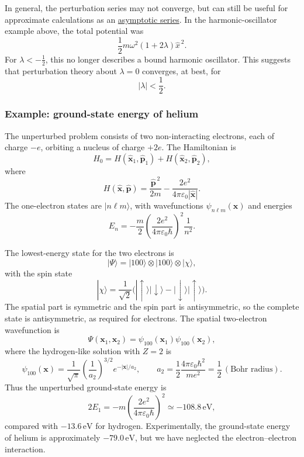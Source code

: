 \documentclass[11pt,a4paper]{article}
\begin{document}
In general, the perturbation series may not converge, but can still be
useful for approximate calculations as an \underline{asymptotic series}.
In the harmonic-oscillator example above, the total potential was
\[
    \frac12m\omega^2(1+2\lambda)\hat x^{\,2}.
\]
For $\lambda<-\tfrac12$, this no longer describes a bound harmonic
oscillator. This suggests that perturbation theory about $\lambda=0$
converges, at best, for
\[
    |\lambda|<\frac12.
\]

\subsubsection*{Example: ground-state energy of helium}

The unperturbed problem consists of two non-interacting electrons,
each of charge $-e$, orbiting a nucleus of charge $+2e$. The Hamiltonian is
\[
    H_0=H(\hat{\mathbf x}_1,\hat{\mathbf p}_1)
       +H(\hat{\mathbf x}_2,\hat{\mathbf p}_2),
\]
where
\[
    H(\hat{\mathbf x},\hat{\mathbf p})
      =\frac{\hat{\mathbf p}^{\,2}}{2m}
       -\frac{2e^2}{4\pi\varepsilon_0|\hat{\mathbf x}|}.
\]
The one-electron states are $|n\ell m\rangle$, with wavefunctions
$\psi_{n\ell m}(\mathbf x)$ and energies
\[
    E_n=-\frac{m}{2}
       \left(\frac{2e^2}{4\pi\varepsilon_0\hbar}\right)^2
       \frac{1}{n^2}.
\]

The lowest-energy state for the two electrons is
\[
    |\Psi\rangle=|100\rangle\otimes|100\rangle\otimes|\chi\rangle,
\]
with the spin state
\[
    |\chi\rangle=\frac{1}{\sqrt2}
       \bigl(|\uparrow\rangle|\downarrow\rangle
             -|\downarrow\rangle|\uparrow\rangle\bigr).
\]
The spatial part is symmetric and the spin part is antisymmetric, so
the complete state is antisymmetric, as required for electrons.
The spatial two-electron wavefunction is
\[
    \Psi(\mathbf x_1,\mathbf x_2)
      =\psi_{100}(\mathbf x_1)\psi_{100}(\mathbf x_2),
\]
where the hydrogen-like solution with $Z=2$ is
\[
    \psi_{100}(\mathbf x)
       =\frac{1}{\sqrt\pi}
        \left(\frac{1}{a_2}\right)^{3/2}
        e^{-|\mathbf x|/a_2},
    \qquad
    a_2=\frac12\frac{4\pi\varepsilon_0\hbar^2}{me^2}
       =\frac12\,(\text{Bohr radius}).
\]
Thus the unperturbed ground-state energy is
\[
    2E_1=-m\left(\frac{2e^2}{4\pi\varepsilon_0\hbar}\right)^2
       \simeq-108.8\,\mathrm{eV},
\]
compared with $-13.6\,\mathrm{eV}$ for hydrogen.
Experimentally, the ground-state energy of helium is approximately
$-79.0\,\mathrm{eV}$, but we have neglected the electron--electron
interaction.
\end{document}
